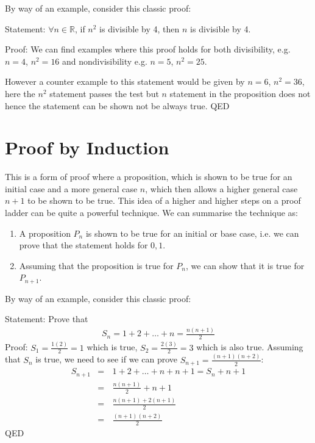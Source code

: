 \documentclass[letterpaper,10pt,english]{jupyterBook}
\begin{document}
\sphinxAtStartPar
By way of an example, consider this classic proof:

\sphinxAtStartPar
Statement: \(\forall n \in \mathbb{R}\), if \(n^2\) is divisible by 4, then \(n\) is divisible by 4.

\sphinxAtStartPar
Proof:
We can find examples where this proof holds for both divisibility, e.g. \(n=4\), \(n^2 = 16\) and non\sphinxhyphen{}divisibility e.g. \(n=5\), \(n^2=25\).

\sphinxAtStartPar
However a counter example to this statement would be given by \(n = 6\), \(n^2=36\), here the \(n^2\) statement passes the test but \(n\) statement in the
proposition does not \sphinxhyphen{} hence the statement can be shown not be always true.  QED


\section{Proof by Induction}
\label{\detokenize{ProofLogic/methodsofproof:proof-by-induction}}
\sphinxAtStartPar
This is a form of proof where a proposition, which is shown to be true for an initial case and a more general case \(n\), which then allows a higher general
case \(n+1\) to be shown to be true.  This idea of a higher and higher steps on a proof ladder can be quite a powerful technique.  We can summarise the technique as:
\begin{enumerate}
%
\item {} 
\sphinxAtStartPar
A proposition \(P_n\) is shown to be true for an initial or base case, i.e. we can prove that the statement holds for \(0, 1\).

\item {} 
\sphinxAtStartPar
Assuming that the proposition is true for \(P_n\), we can show that it is true for \(P_{n+1}\).

\end{enumerate}

\sphinxAtStartPar
By way of an example, consider this classic proof:

\sphinxAtStartPar
Statement: Prove that
\begin{equation*}
\begin{split}S_n = 1 + 2 + \dots + n = \frac{n(n+1)}{2}\end{split}
\end{equation*}
\sphinxAtStartPar
Proof:
\(S_1 = \frac{1(2)}{2} = 1\) which is true, \(S_2 = \frac{2(3)}{2} = 3\) which is also true. Assuming that \(S_n\) is true, we need to see if we can prove \(S_{n+1} = \frac{(n+1)(n+2)}{2}\):
\begin{equation*}
\begin{split}S_{n+1} &=&\, 1 + 2 + \dots + n + n+1 = S_{n} + n+1 \\ 
&=&\, \frac{n(n+1)}{2} + n+1 \\ 
&=&\, \frac{n(n+1) + 2(n+1)}{2} \\ 
&=&\, \frac{(n+1)(n+2)}{2}\end{split}
\end{equation*}
\sphinxAtStartPar
QED
\end{document}
